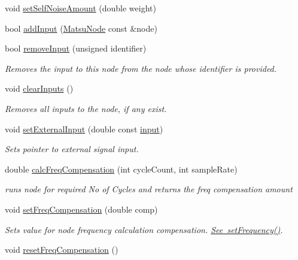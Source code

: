 \begin{DoxyCompactItemize}
\item 
void \mbox{\hyperlink{classMatsuNode_abc2600fa8de6d090296ee5f152a01916}{set\+Self\+Noise\+Amount}} (double weight)
\item 
bool \mbox{\hyperlink{classMatsuNode_a1eb3cb48dd269efdb5f629f363380fb6}{add\+Input}} (\mbox{\hyperlink{classMatsuNode}{Matsu\+Node}} const \&node)
\item 
bool \mbox{\hyperlink{classMatsuNode_a70d3d593cb1ebb8a909bfc743867d348}{remove\+Input}} (unsigned identifier)
\begin{DoxyCompactList}\small\item\em Removes the input to this node from the node whose identifier is provided. \end{DoxyCompactList}\item 
void \mbox{\hyperlink{classMatsuNode_a83d81a42f74cadc3f403b65e8b50461e}{clear\+Inputs}} ()
\begin{DoxyCompactList}\small\item\em Removes all inputs to the node, if any exist. \end{DoxyCompactList}\item 
void \mbox{\hyperlink{classMatsuNode_af1538d4e992122d520e221332f05a53e}{set\+External\+Input}} (double const \mbox{\hyperlink{MatsuokaEngine_8cpp_acf1d87f955cfce1c6b5df219f4c6b34a}{input}})
\begin{DoxyCompactList}\small\item\em Sets pointer to external signal input. \end{DoxyCompactList}\item 
double \mbox{\hyperlink{classMatsuNode_a19e5a623c7627ab7f7c94dbd71b67554}{calc\+Freq\+Compensation}} (int cycle\+Count, int sample\+Rate)
\begin{DoxyCompactList}\small\item\em runs node for required No of Cycles and returns the freq compensation amount \end{DoxyCompactList}\item 
void \mbox{\hyperlink{classMatsuNode_a800722180d2d170f80fd61e1db151c05}{set\+Freq\+Compensation}} (double comp)
\begin{DoxyCompactList}\small\item\em Sets value for node frequency calculation compensation. \mbox{\hyperlink{classMatsuNode_adb33b1e7dcfaf786be5d99627bca1c14}{See set\+Frequency()}}. \end{DoxyCompactList}\item 
void \mbox{\hyperlink{classMatsuNode_a131b380ea1f15f19ecc8c3fb4931f6dd}{reset\+Freq\+Compensation}} ()

\end{DoxyCompactItemize}
